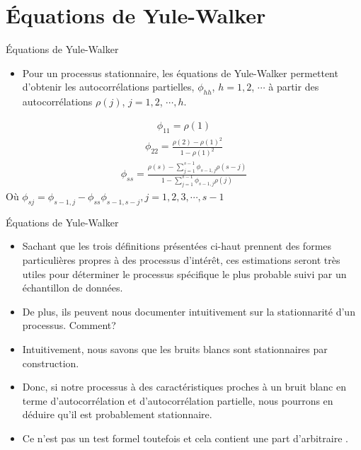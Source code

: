 \documentclass{beamer}
\begin{document}
\section{Équations de Yule-Walker}
\frame{\tableofcontents[current]}

\begin{frame}{Équations de Yule-Walker}
\begin{itemize}
\item Pour un processus stationnaire, les équations de Yule-Walker permettent d’obtenir les autocorrélations partielles, $\phi_{hh}$, $h=1,2$, $\cdots$ à partir des autocorrélations $\rho(j)$, $j=1,2$, $\cdots,h.$
\end{itemize}
\begin{align*}
\phi_{11}=\rho(1)
\end{align*}
\begin{align*}
\phi_{22}=\frac{\rho(2)-\rho(1)^2}{1-\rho(1)^2}
\end{align*}
\begin{align*}
\phi_{ss}=\frac{\rho(s)-\sum_{j=1}^{s-1}\phi_{s-1,j}\rho(s-j)}{1-\sum_{j=1}^{s-1}\phi_{s-1,j}\rho(j)}
\end{align*}
Où $\phi_{sj}=\phi_{s-1,j}-\phi_{ss} \phi_{s-1,s-j}, j=1,2,3,\cdots, s-1$
\end{frame}


\begin{frame}{Équations de Yule-Walker}
\begin{itemize}
\item Sachant que les trois définitions présentées ci-haut prennent des formes particulières propres à des processus d’intérêt, ces estimations seront très utiles pour déterminer le processus spécifique le plus probable suivi par un échantillon de données. 
\item De plus, ils peuvent nous documenter intuitivement sur la stationnarité d’un processus. Comment?
\item Intuitivement, nous savons que les bruits blancs sont stationnaires par construction. 
\item Donc, si notre processus à des caractéristiques proches à un bruit blanc en terme d’autocorrélation et d’autocorrélation partielle, nous pourrons en déduire qu’il est probablement stationnaire. 
\item Ce n’est pas un test formel toutefois et cela contient une part d’arbitraire . 
\end{itemize}
\end{frame}
\end{document}
